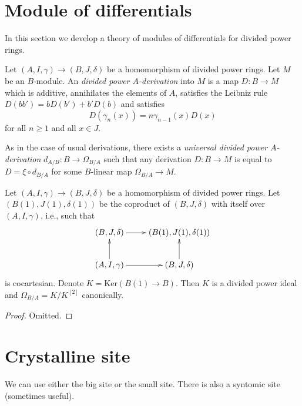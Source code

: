 \section{Module of differentials}
\label{section-differentials}

\noindent
In this section we develop a theory of modules of differentials
for divided power rings.

\begin{definition}
\label{definition-derivation}
Let $(A, I, \gamma) \to (B, J, \delta)$ be a homomorphism
of divided power rings. Let $M$ be an $B$-module.
An {\it divided power $A$-derivation} into $M$ is a map $D : B \to M$ which is
additive, annihilates the elements of $A$, satisfies the
Leibniz rule $D(bb') = bD(b') + b'D(b)$ and satisfies
$$
D(\gamma_n(x)) = n\gamma_{n - 1}(x)D(x)
$$
for all $n \geq 1$ and all $x \in J$.
\end{definition}

\noindent
As in the case of usual derivations, there exists a
{\it universal divided power $A$-derivation} $d_{A/B} : B \to \Omega_{B/A}$
such that any derivation $D : B \to M$ is equal to
$D = \xi \circ d_{B/A}$ for some $B$-linear map $\Omega_{B/A} \to M$.

\begin{lemma}
\label{lemma-diagonal-and-differentials}
Let $(A, I, \gamma) \to (B, J, \delta)$ be a homomorphism
of divided power rings. Let $(B(1), J(1), \delta(1))$ be the coproduct
of $(B, J, \delta)$ with itself over $(A, I, \gamma)$, i.e.,
such that
$$
\xymatrix{
(B, J, \delta) \ar[r] & (B(1), J(1), \delta(1)) \\
(A, I, \gamma) \ar[r] \ar[u] & (B, J, \delta) \ar[u]
}
$$
is cocartesian. Denote $K = \text{Ker}(B(1) \to B)$.
Then $K$ is a divided power ideal and $\Omega_{B/A} = K/K^{[2]}$
canonically.
\end{lemma}

\begin{proof}
Omitted.
\end{proof}






\section{Crystalline site}
\label{section-site}

\noindent
We can use either the big site or the small site.
There is also a syntomic site (sometimes useful).

